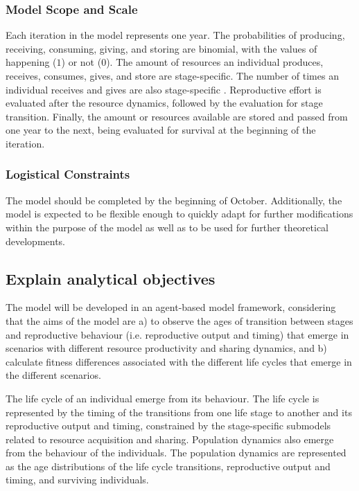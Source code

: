 \documentclass{article}
\begin{document}
\subsubsection{Model Scope and Scale}

Each iteration in the model represents one year. The probabilities  of producing, receiving, consuming, giving, and storing are binomial, with the values of happening ($1$) or not ($0$). The amount of resources an individual produces, receives, consumes, gives, and store are stage-specific. The number of times an individual receives and gives are also stage-specific . Reproductive effort is evaluated after the resource dynamics, followed by the evaluation for stage transition. Finally, the amount or resources available are stored and passed from one year to the next, being evaluated for survival at the beginning of the iteration.

\subsubsection{Logistical Constraints}

The model should be completed by the beginning of October. Additionally, the model is expected to be flexible enough to quickly adapt for further modifications within the purpose of the model as well as to be used for further theoretical developments.

\subsection{Explain analytical objectives}

The model will be developed in an agent-based model framework, considering that the aims of the model are a) to observe the ages of transition between stages and reproductive behaviour (i.e. reproductive output and timing) that emerge in scenarios with different resource productivity and sharing dynamics, and b) calculate fitness differences associated with the different life cycles that emerge in the different scenarios.

The life cycle of an individual emerge from its behaviour. The life cycle is represented by the timing of the transitions from one life stage to another and its reproductive output and timing, constrained by the stage-specific submodels related to resource acquisition and sharing. Population dynamics also emerge from the behaviour of the individuals. The population dynamics are represented as the age distributions of the life cycle transitions, reproductive output and timing, and surviving individuals.
\end{document}
